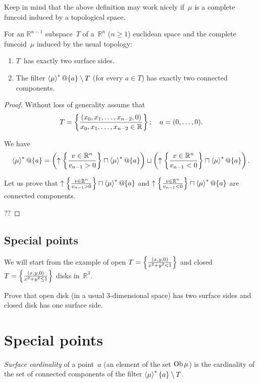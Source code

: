 Keep in mind that the above definition may work nicely if~$\mu$ is
a complete funcoid induced by a topological space.

\begin{example}
For an $\mathbb{R}^{n-1}$ subspace~$T$ of a~$\mathbb{R}^n$ ($n\geq 1$)
euclidean space and the complete funcoid~$\mu$ induced by the usual topology:
\begin{enumerate}
\item $T$~has exactly two surface sides.
\item The filter $\left\langle \mu\right\rangle ^{\ast}@\{a\} \setminus T$ (for every $a\in T$)
  has exactly two connected components.
\end{enumerate}
\end{example}

\begin{proof}
Without loss of generality assume that
\[ T=\left\{ \frac{(x_0,x_1,\dots,x_{n-2},0)}{
x_0,x_1,\dots,x_{n-2}\in\mathbb{R}}\right\};
\quad
a = (0,\dots,0). \]

We have
\[ \left\langle \mu\right\rangle ^{\ast}@\{a\} =
\left(\uparrow\left\{ \frac{v\in\mathbb{R}^n}{v_{n-1}>0}\right\}\sqcap\left\langle \mu\right\rangle ^{\ast}@\{a\}\right)
\sqcup
\left(\uparrow\left\{ \frac{v\in\mathbb{R}^n}{v_{n-1}<0}\right\}\sqcap\left\langle \mu\right\rangle ^{\ast}@\{a\}\right). \]

Let us prove that
$\uparrow\left\{ \frac{v\in\mathbb{R}^n}{v_{n-1}>0}\right\}\sqcap\left\langle \mu\right\rangle ^{\ast}@\{a\}$ and
$\uparrow\left\{ \frac{v\in\mathbb{R}^n}{v_{n-1}<0}\right\}\sqcap\left\langle \mu\right\rangle ^{\ast}@\{a\}$ are
connected components.

??
\end{proof}

\subsection{Special points}

We will start from the example of open $T=\left\{ \frac{(x,y,0)}{x^2+y^2<1}\right\}$
and closed $T=\left\{ \frac{(x,y,0)}{x^2+y^2\leq 1}\right\}$ disks in~$\mathbb{R}^3$.

\begin{xca}
Prove that open disk (in a usual 3-dimensional space) has two surface sides
and closed disk has one surface side.
\end{xca}

\section{Special points}

\begin{defn}
\emph{Surface cardinality} of a point~$a$ (an element of the set $\operatorname{Ob}\mu$) is
the cardinality of the set of connected components of the filter
$\left\langle \mu\right\rangle ^{\ast}\{a\}\setminus T$.
\end{defn}

